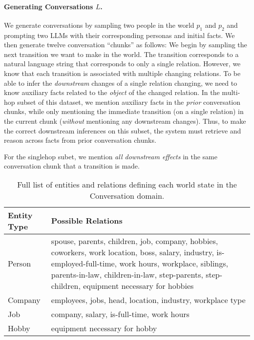 \paragraph{Generating Conversations $L$.} We generate conversations by sampling two people in the world $p_1$ and $p_2$ and prompting two LLMs with their corresponding personas and initial facts.
We then generate twelve conversation ``chunks'' as follows:
We begin by sampling the next transition we want to make in the world.
The transition corresponds to a natural language string that corresponds to only a single relation. However, we know that each transition is associated with multiple changing relations. To be able to infer the \textit{downstream} changes of a single relation changing, we need to know auxiliary facts related to the \textit{object} of the changed relation.
In the multi-hop subset of this dataset, we mention auxiliary facts in the \textit{prior} conversation chunks, while only mentioning the immediate transition (on a single relation) in the current chunk (\textit{without} mentioning any downstream changes). Thus, to make the correct downstream inferences on this subset, the system must retrieve and reason across facts from prior conversation chunks.

For the singlehop subet, we mention \textit{all downstream effects} in the same conversation chunk that a transition is made.

\begin{table*}[]
    \centering
    \begin{tabular}{p{2cm}p{13cm}}
    \toprule
        Entity Type & Possible Relations \\
        \midrule
        Person & spouse, parents, children, job, company, hobbies, coworkers, work location, boss, salary, industry, is-employed-full-time, work hours, workplace, siblings, parents-in-law, children-in-law, step-parents, step-children, equipment necessary for hobbies \\
        Company & employees, jobs, head, location, industry, workplace type \\
        Job & company, salary, is-full-time, work hours \\
        Hobby & equipment necessary for hobby \\
        \bottomrule
    \end{tabular}
    \caption{Full list of entities and relations defining each world state in the Conversation domain.}
    \label{tab:convo_states}
\end{table*}

